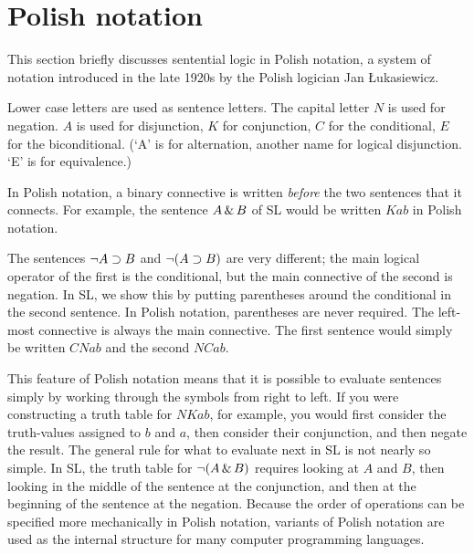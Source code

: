 \section*{Polish notation}

This section briefly discusses sentential logic in Polish notation, a system of notation introduced in the late 1920s by the Polish logician Jan {\L}ukasiewicz.

Lower case letters are used as sentence letters. The capital letter $N$ is used for negation. $A$ is used for disjunction, $K$ for conjunction, $C$ for the conditional, $E$ for the biconditional. (`A' is for alternation, another name for logical disjunction. `E' is for equivalence.)

In Polish notation, a binary connective is written \emph{before} the two sentences that it connects. For example, the sentence $A\,\&\, B$ of SL would be written $Kab$ in Polish notation.

The sentences $\neg A\supset B$ and $\neg (A\supset B)$ are very different; the main logical operator of the first is the conditional, but the main connective of the second is negation. In SL, we show this by putting parentheses around the conditional in the second sentence. In Polish notation, parentheses are never required. The left-most connective is always the main connective. The first sentence would simply be written $CNab$ and the second $NCab$.

This feature of Polish notation means that it is possible to evaluate sentences simply by working through the symbols from right to left. If you were constructing a truth table for $NKab$, for example, you would first consider the truth-values assigned to $b$ and $a$, then consider their conjunction, and then negate the result. The general rule for what to evaluate next in SL is not nearly so simple. In SL, the truth table for $\neg(A\,\&\, B)$ requires looking at $A$ and $B$, then looking in the middle of the sentence at the conjunction, and then at the beginning of the sentence at the negation. Because the order of operations can be specified more mechanically in Polish notation, variants of Polish notation are used as the internal structure for many computer programming languages.


